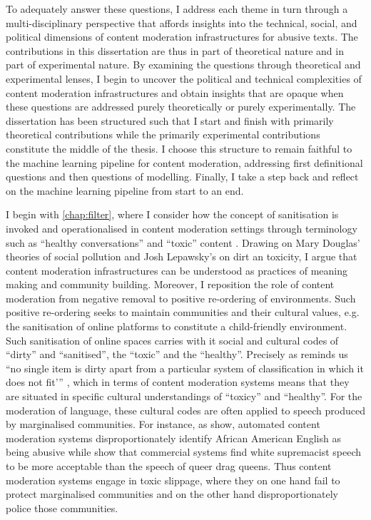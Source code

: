 To adequately answer these questions, I address each theme in turn through a multi-disciplinary perspective that affords insights into the technical, social, and political dimensions of content moderation infrastructures for abusive texts.
The contributions in this dissertation are thus in part of theoretical nature and in part of experimental nature.
By examining the questions through theoretical and experimental lenses, I begin to uncover the political and technical complexities of content moderation infrastructures and obtain insights that are opaque when these questions are addressed purely theoretically or purely experimentally.
The dissertation has been structured such that I start and finish with primarily theoretical contributions while the primarily experimental contributions constitute the middle of the thesis.
I choose this structure to remain faithful to the machine learning pipeline for content moderation, addressing first definitional questions and then questions of modelling.
Finally, I take a step back and reflect on the machine learning pipeline from start to an end.

I begin with \cref{chap:filter}, where I consider how the concept of sanitisation is invoked and operationalised in content moderation settings through terminology such as ``healthy conversations'' \citep{Twitter:Health:2018} and ``toxic'' content \citep{Wulczyn:2017,Perspective:Github}.
Drawing on Mary Douglas' \citeyearpar{Douglas:1966} theories of social pollution and Josh Lepawsky's \citeyearpar{Lepawsky:2019} on dirt an toxicity, I argue that content moderation infrastructures can be understood as practices of meaning making and community building.
Moreover, I reposition the role of content moderation from negative removal to positive re-ordering of environments.
Such positive re-ordering seeks to maintain communities and their cultural values, e.g. the sanitisation of online platforms to constitute a child-friendly environment.
Such sanitisation of online spaces carries with it social and cultural codes of ``dirty'' and ``sanitised'', the ``toxic'' and the ``healthy''.
Precisely as \citet{Douglas:1966} reminds us ``no single item is dirty apart from a particular system of classification in which it does not fit’'' \citep[pp. vii]{Douglas}, which in terms of content moderation systems means that they are situated in specific cultural understandings of ``toxicy'' and ``healthy''.
For the moderation of language, these cultural codes are often applied to speech produced by marginalised communities.
For instance, as \citet{Davidson:2019} show, automated content moderation systems disproportionately identify African American English as being abusive while \citet{Dias:2020} show that commercial systems find white supremacist speech to be more acceptable than the speech of queer drag queens.
Thus content moderation systems engage in toxic slippage, where they on one hand fail to protect marginalised communities and on the other hand disproportionately police those communities.

